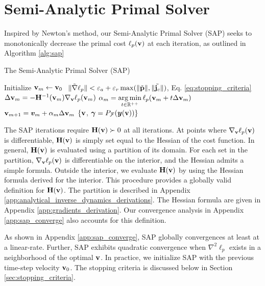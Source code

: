
\section{Semi-Analytic Primal Solver}
\label{sec:sap_solver}

Inspired by Newton's method, our Semi-Analytic Primal Solver (SAP) seeks to
monotonically decrease the primal cost $\ell_p({\mathbf{v}})$ at each iteration, as
outlined in Algorithm \ref{alg:sap}
\begin{algorithm}[H]
	\caption{The Semi-Analytic Primal Solver (SAP)}	
	  \label{alg:sap}
	  \begin{algorithmic}[1]
		  \State Initialize ${\mathbf{v}}_m \gets {\mathbf{v}}_0$ \RepeatUntil
		  $~\Vert\tilde{\nabla}\ell_p\Vert < \varepsilon_a +
		  \varepsilon_r\max(\Vert\tilde{{\mathbf{p}}}\Vert,\Vert\tilde{{\mathbf{j}}_c}\Vert)$,
		  Eq. \eqref{eq:stopping_criteria} \State $\Delta{\mathbf{v}}_{m} =
		  -{\mathbf{H}}^{-1}({\mathbf{v}}_m)\nabla_{\mathbf{v}}\ell_p({\mathbf{v}}_m)$
		  \label{op:Newton_iteration} \State $\displaystyle \alpha_m =
		  \operatorname*{arg\,min}_{t\in\mathbb{R}^{++}} \ell_p({\mathbf{v}}_m + t \Delta{\mathbf{v}}_{m})$
		  \State $\displaystyle {\mathbf{v}}_{m+1} = {\bm{v}}_m +
		  \alpha_{m}\Delta{\mathbf{v}}_{m}$ \EndRepeatUntil \State\Return $\{{\mathbf{v}}$,
		  ${\bm\gamma}=P_\mathcal{F}({\bm{y}}({\mathbf{v}}))\}$
	  \end{algorithmic}
\end{algorithm}

The SAP iterations require ${\mathbf{H}}({\mathbf{v}})\succ 0$ at all iterations.  At points
where $\nabla_{\mathbf{v}}\ell_p({\mathbf{v}})$ is differentiable, ${\mathbf{H}}({\mathbf{v}})$ is simply
set equal to the Hessian of the cost function. In general, ${\mathbf{H}}({\mathbf{v}})$ is
evaluated using a partition of its domain. For each set in the partition,
$\nabla_{\mathbf{v}}\ell_p({\mathbf{v}})$ is differentiable on the interior, and the Hessian
admits a simple formula. Outside the interior, we evaluate ${\mathbf{H}}({\mathbf{v}})$ by
using the Hessian formula derived for the interior. This procedure provides a
globally valid definition for ${\mathbf{H}}({\mathbf{v}})$. The partition is described in
Appendix \ref{app:analytical_inverse_dynamics_derivations}. The Hessian formula
are given in Appendix \ref{app:gradients_derivation}. Our convergence analysis
in Appendix \ref{app:sap_converge} also accounts for this definition.

As shown in Appendix \ref{app:sap_converge}, SAP globally convergences at least
at a linear-rate. Further, SAP exhibits quadratic convergence when $\nabla^2
\ell_p$ exists in a neighborhood of the optimal ${\mathbf{v}}$. In practice, we
initialize SAP with the previous time-step velocity ${\mathbf{v}}_0$. The stopping
criteria is discussed below in Section \ref{sec:stopping_criteria}.

